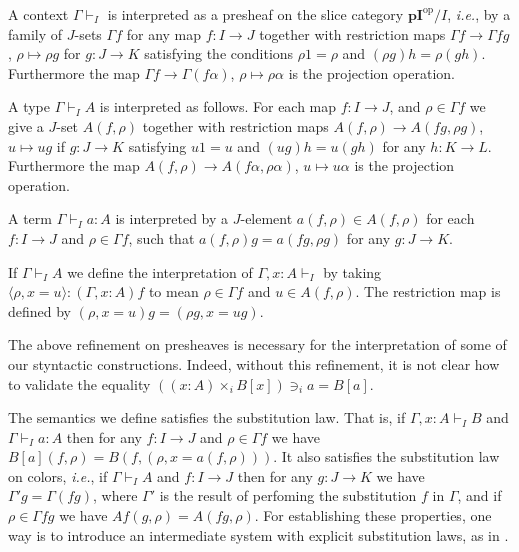 \documentclass[english]{PaperTools/latex/lipics}
\newcommand\CTimes[2]{(#2) ×_{#1}}
\newcommand\op[1]{∋_{#1}}
\def\pI{\ensuremath{\mathbf{pI}}}
\def\ie{\textit{i.e.}}
\def\opp{\mathrm{op}}
\begin{document}
\bigskip
A context $Γ ⊢_I$ is interpreted as a presheaf on the slice category
$\pI^\opp/I$, \ie, by a family of $J$-sets $Γf$ for any map $f : I → J$
together with restriction maps $Γ f → Γ fg$, $ρ ↦ ρg$
for $g : J → K$ satisfying the conditions $ρ 1 = ρ$ and $(ρg)h = ρ(gh)$.
Furthermore the map $Γf → Γ(fα)$, $ρ ↦ ρα$ is the projection operation.

\medskip
A type $Γ ⊢_I A$ is interpreted as follows.
For each map $f : I → J$, and $ρ ∈ Γf$ we give a $J$-set $A(f,ρ)$
together with restriction maps $A(f,ρ) → A(fg,ρg)$, $u ↦ ug$ if $g : J → K$
satisfying $u1 = u$ and $(ug)h = u(gh)$ for any $h : K → L$.
Furthermore the map $A(f,ρ) → A(fα,ρα)$, $u ↦ uα$ is the projection operation.

\medskip
A term $Γ ⊢_I a : A$ is interpreted by a $J$-element $a(f,ρ) ∈ A(f,ρ)$
for each $f: I → J$ and $ρ ∈ Γf$, such that
$a(f,ρ)g = a(fg,ρg)$ for any $g : J → K$.


\medskip
If $Γ ⊢_I A$ we define the interpretation of $Γ,x:A ⊢_I$
by taking $⟨ρ,x=u⟩ : (Γ,x:A)f$ to mean $ρ ∈ Γf$ and $u ∈ A(f,ρ)$. The
restriction map is defined by $(ρ,x=u)g = (ρ g, x=ug)$.

\bigskip
The above refinement on presheaves is necessary for the interpretation
of some of our styntactic constructions.  Indeed, without this refinement,
it is not clear how to validate the equality
${{(\CTimes i {x:A} B[x])} \op i a = B[a]}$.

\bigskip
The semantics we define satisfies the substitution law. That is, if $Γ,x:A ⊢_I B$
and $Γ ⊢_I a:A$ then for any $f : I → J$ and $ρ ∈ Γ f$ we have
$B[a](f,ρ) = B(f,(ρ,x=a(f,ρ)))$.
It also satisfies the substitution law on colors, \ie, if $Γ ⊢_I A$ and
$f : I → J$ then for any $g : J → K$ we have $Γ'g = Γ(fg)$,
where $Γ'$ is the result of perfoming the substitution $f$ in $Γ$, and if
$ρ ∈ Γfg$ we have $Af (g,ρ) = A(fg,ρ)$.
For establishing these properties, one way is to introduce an intermediate
system with explicit substitution laws, as in \citep{dybjer_inductive_1994}.
\end{document}
